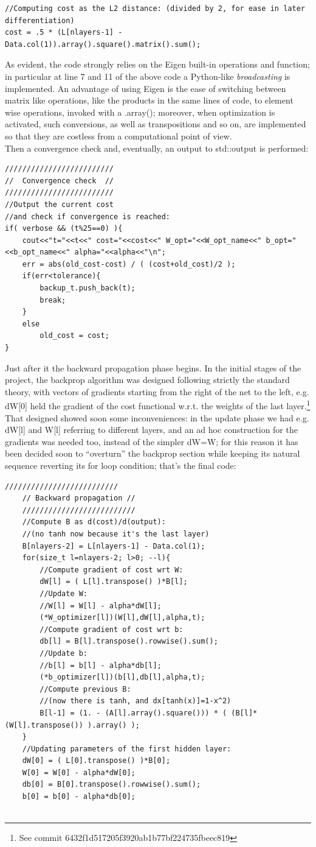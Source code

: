 \documentclass[12pt, a4paper]{report}
\theoremstyle{definition}
\begin{document}
{\begin{lstlisting}[frame=single]
//Computing cost as the L2 distance: (divided by 2, for ease in later differentiation)
cost = .5 * (L[nlayers-1] - Data.col(1)).array().square().matrix().sum();
\end{lstlisting}
As evident, the code strongly relies on the Eigen built-in operations and function; in particular at line 7 and 11 of the above code a Python-like \textit{broadcasting} is implemented. An advantage of using Eigen is the ease of switching between matrix like operations, like the products in the same lines of code, to element wise operations, invoked with a {\ttfamily .array()}; moreover, when optimization is activated, such conversions, as well as transpositions and so on, are implemented so that they are costless from a computational point of view.\\
Then a convergence check and, eventually, an output to std::output is performed:
\begin{lstlisting}[frame=single, showstringspaces=false]
/////////////////////////
//  Convergence check  //
/////////////////////////
//Output the current cost
//and check if convergence is reached:
if( verbose && (t%25==0) ){
	cout<<"t="<<t<<" cost="<<cost<<" W_opt="<<W_opt_name<<" b_opt="<<b_opt_name<<" alpha="<<alpha<<"\n";
	err = abs(old_cost-cost) / ( (cost+old_cost)/2 );
	if(err<tolerance){
		backup_t.push_back(t);
		break;
	}
	else
		old_cost = cost;
}
\end{lstlisting}
Just after it the backward propagation phase begins. In the initial stages of the project, the backprop algorithm was designed following strictly the standard theory, with vectors of gradients starting from the right of the net to the left, e.g. {\ttfamily dW[0]} held the gradient of the cost functional w.r.t. the weights of the last layer.\footnote{See commit 6432f1d517205f3920ab1b77bf224735fbeec819} That designed showed soon some inconveniences: in the update phase we had e.g. {\ttfamily dW[l]} and {\ttfamily W[l]} referring to different layers, and an ad hoc construction for the gradients was needed too, instead of the simpler {\ttfamily dW=W}; for this reason it has been decided soon to ``overturn'' the backprop section while keeping its natural sequence reverting its for loop condition; that's the final code:
\begin{lstlisting}[frame=single]
	//////////////////////////
	// Backward propagation //
	//////////////////////////
	//Compute B as d(cost)/d(output): 
	//(no tanh now because it's the last layer)
	B[nlayers-2] = L[nlayers-1] - Data.col(1);	
	for(size_t l=nlayers-2; l>0; --l){
		//Compute gradient of cost wrt W:
		dW[l] = ( L[l].transpose() )*B[l];
		//Update W:
		//W[l] = W[l] - alpha*dW[l];
		(*W_optimizer[l])(W[l],dW[l],alpha,t);
		//Compute gradient of cost wrt b:
		db[l] = B[l].transpose().rowwise().sum();
		//Update b:
		//b[l] = b[l] - alpha*db[l];
		(*b_optimizer[l])(b[l],db[l],alpha,t);
		//Compute previous B: 
		//(now there is tanh, and dx[tanh(x)]=1-x^2)
		B[l-1] = (1. - (A[l].array().square())) * ( (B[l]* (W[l].transpose()) ).array() );
	}
	//Updating parameters of the first hidden layer:
	dW[0] = ( L[0].transpose() )*B[0];
	W[0] = W[0] - alpha*dW[0];
	db[0] = B[0].transpose().rowwise().sum();
	b[0] = b[0] - alpha*db[0];


\end{lstlisting}}
\end{document}
